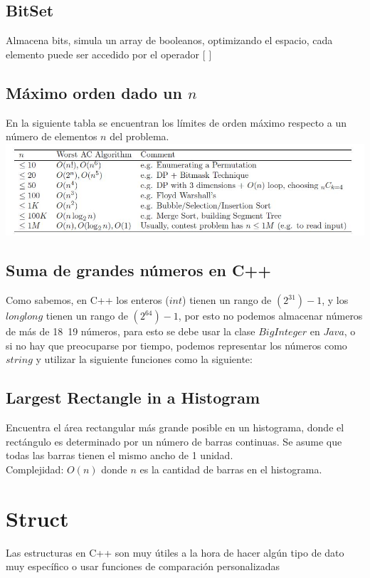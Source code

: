 \documentclass[10pt,letterpaper]{article}
\newcommand{\source}[1]{
  
  \dotfill
}
\begin{document}
  \subsection{BitSet}
    Almacena bits, simula un array de booleanos, optimizando el espacio, cada elemento puede ser accedido por el operador $[$ $]$\\
    \source{./src/bitset.cpp}
  \subsection{Máximo orden dado un $n$}
    En la siguiente tabla se encuentran los límites de orden máximo respecto a un número de elementos $n$ del problema.\\
    \includegraphics[scale=0.5]{./src/maxorder.jpg}
  \subsection{Suma de grandes números en C++}
    Como sabemos, en C++ los enteros ($int$) tienen un rango de $(2^31)-1$, y los $long long$ tienen un rango de $(2^64)-1$, por esto no podemos almacenar números de más de 18~19 números, para esto se debe usar la clase $BigInteger$ en $Java$, o si no hay que preocuparse por tiempo, podemos representar los números como $string$ y utilizar la siguiente funciones como la siguiente:
    \source{./src/bigIntegerCpp.cpp}
  \subsection{Largest Rectangle in a Histogram}
    Encuentra el área rectangular más grande posible en un histograma, donde el rectángulo es determinado por un número de barras continuas. Se asume que todas las barras tienen el mismo ancho de 1 unidad. \\
    Complejidad: $O(n)$ donde $n$ es la cantidad de barras en el histograma.
    \source{./src/largest_rectangle.cpp}

\section{Struct}
  Las estructuras en C++ son muy útiles a la hora de hacer algún tipo de dato muy específico o usar funciones de comparación personalizadas
\end{document}
